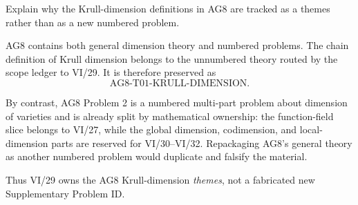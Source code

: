 \begin{problem}\label{prob:vi29-19}
Explain why the Krull-dimension definitions in AG8 are tracked as a themes rather than as a new numbered problem.

\end{problem}

\ifdefined\FullProblemDossiers
\begin{solution}
AG8 contains both general dimension theory and numbered problems.  The chain definition of Krull dimension
belongs to the unnumbered theory routed by the scope ledger to VI/29.  It is therefore preserved as
\[
\text{AG8-T01-KRULL-DIMENSION}.
\]

By contrast, AG8 Problem 2 is a numbered multi-part problem about dimension of varieties and is already split by
mathematical ownership: the function-field slice belongs to VI/27, while the global dimension, codimension, and
local-dimension parts are reserved for VI/30--VI/32.  Repackaging AG8's general theory as another numbered
problem would duplicate and falsify the material.

Thus VI/29 owns the AG8 Krull-dimension \emph{themes}, not a fabricated new Supplementary Problem ID.
\end{solution}
\fi
